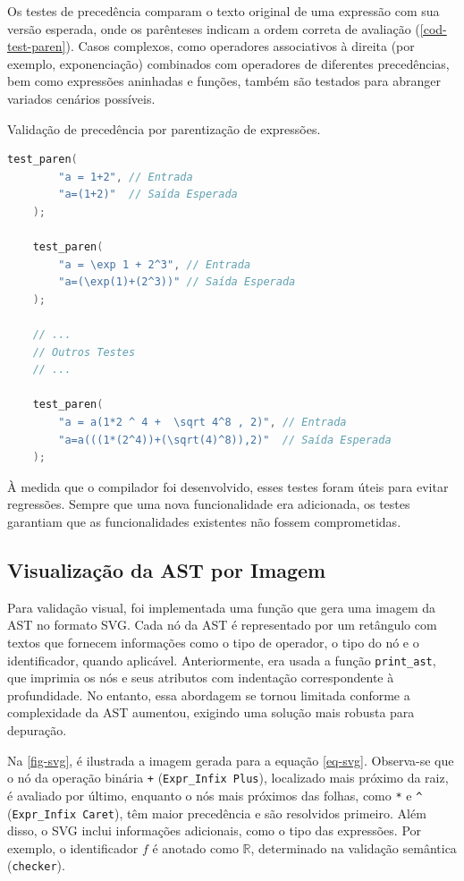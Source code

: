 Os testes de precedência comparam o texto original de uma expressão com sua versão esperada, onde os parênteses indicam a ordem correta de avaliação (\autoref{cod-test-paren}). Casos complexos, como operadores associativos à direita (por exemplo, exponenciação) combinados com operadores de diferentes precedências, bem como expressões aninhadas e funções, também são testados para abranger variados cenários possíveis.


\begin{codigo}[H]
    \caption{\small Validação de precedência por parentização de expressões.}
        \label{cod-test-paren}
  \begin{lstlisting}[language = C]
    test_paren(
        "a = 1+2", // Entrada
        "a=(1+2)"  // Saída Esperada
    );

    test_paren(
        "a = \exp 1 + 2^3", // Entrada
        "a=(\exp(1)+(2^3))" // Saída Esperada
    );

    // ...
    // Outros Testes
    // ...

    test_paren(
        "a = a(1*2 ^ 4 +  \sqrt 4^8 , 2)", // Entrada
        "a=a(((1*(2^4))+(\sqrt(4)^8)),2)"  // Saída Esperada
    );
  \end{lstlisting}
\end{codigo}

À medida que o compilador foi desenvolvido, esses testes foram úteis para evitar regressões. Sempre que uma nova funcionalidade era adicionada, os testes garantiam que as funcionalidades existentes não fossem comprometidas.




\subsection{Visualização da AST por Imagem} \label{subsection-svg}

Para validação visual, foi implementada uma função que gera uma imagem da AST no formato SVG. Cada nó da AST é representado por um retângulo com textos que fornecem informações como o tipo de operador, o tipo do nó e o identificador, quando aplicável. Anteriormente, era usada a função \texttt{print\_ast}, que imprimia os nós e seus atributos com indentação correspondente à profundidade. No entanto, essa abordagem se tornou limitada conforme a complexidade da AST aumentou, exigindo uma solução mais robusta para depuração.

Na \autoref{fig-svg}, é ilustrada a imagem gerada para a equação \autoref{eq-svg}. Observa-se que o nó da operação binária \texttt{+} (\verb"Expr_Infix Plus"), localizado mais próximo da raiz, é avaliado por último, enquanto o nós mais próximos das folhas, como \texttt{*} e \texttt{\^} (\verb"Expr_Infix Caret"), têm maior precedência e são resolvidos primeiro. Além disso, o SVG inclui informações adicionais, como o tipo das expressões. Por exemplo, o identificador \( f \) é anotado como \( \mathbb{R} \), determinado na validação semântica (\texttt{checker}).

